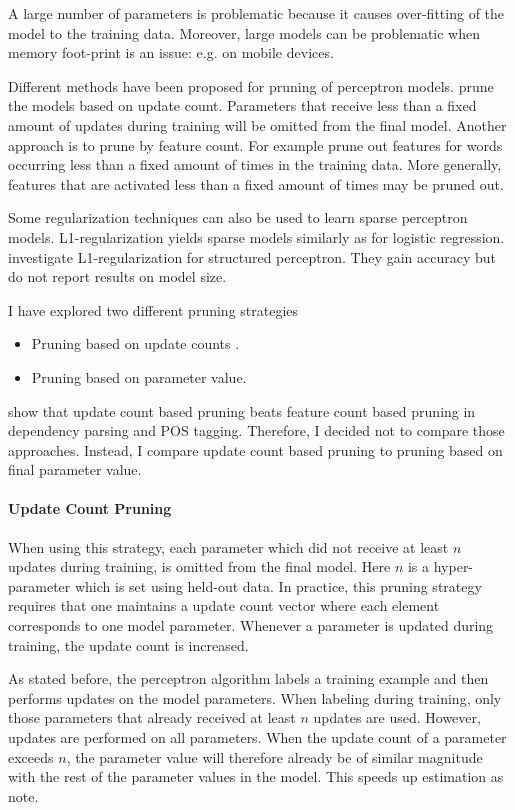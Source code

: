 A large number of parameters is problematic because it causes
over-fitting of the model to the training data. Moreover, large models
can be problematic when memory foot-print is an issue: e.g. on mobile
devices.

Different methods have been proposed for pruning of perceptron
models. \cite{Goldberg2011} prune the models based on update
count. Parameters that receive less than a fixed amount of updates
during training will be omitted from the final model. Another approach
is to prune by feature count. For example \cite{Hulden2013} prune
out features for words occurring less than a fixed amount of times in
the training data. More generally, features that are activated less than
a fixed amount of times may be pruned out. 

Some regularization techniques can also be used to learn sparse
perceptron models. L1-regularization yields sparse models similarly as
for logistic regression. \cite{Zhang2014} investigate
L1-regularization for structured perceptron. They gain accuracy but do
not report results on model size.

I have explored two different pruning strategies
\begin{itemize}
\item Pruning based on update counts \citep{Goldberg2011}.
\item Pruning based on parameter value.
\end{itemize}
\cite{Goldberg2011} show that update count based pruning beats feature
count based pruning in dependency parsing and POS tagging. Therefore,
I decided not to compare those approaches. Instead, I compare update
count based pruning to pruning based on final parameter value.

\paragraph{Update Count Pruning} When using this strategy, each
parameter which did not receive at least $n$ updates during training,
is omitted from the final model. Here $n$ is a hyper-parameter which
is set using held-out data. In practice, this pruning strategy
requires that one maintains a update count vector where each element
corresponds to one model parameter. Whenever a parameter is updated
during training, the update count is increased.

As stated before, the perceptron algorithm labels a training example
and then performs updates on the model parameters. When labeling
during training, only those parameters that already received at least
$n$ updates are used. However, updates are performed on all
parameters. When the update count of a parameter exceeds $n$, the
parameter value will therefore already be of similar magnitude with
the rest of the parameter values in the model. This speeds up
estimation as \cite{Goldberg2011} note.

